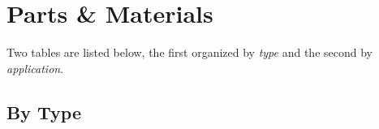 \renewcommand{\thechapter}{C}
\chapter{Parts \& Materials}

Two tables are listed below, the first organized by \textit{type} and the
second by \textit{application}.

\section{By Type}

